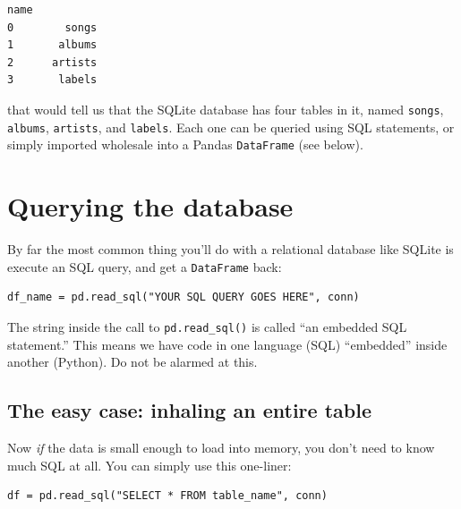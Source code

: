 \begin{Verbatim}[fontsize=\small,samepage=true,frame=leftline,framesep=5mm,framerule=1mm]
          name
0        songs
1       albums
2      artists
3       labels
\end{Verbatim}

that would tell us that the SQLite database has four tables in it, named
\texttt{songs}, \texttt{albums}, \texttt{artists}, and \texttt{labels}. Each
one can be queried using SQL statements, or simply imported wholesale into a
Pandas \texttt{DataFrame} (see below).

\section{Querying the database}


By far the most common thing you'll do with a relational database like SQLite
is execute an SQL query, and get a \texttt{DataFrame} back:

\begin{Verbatim}[fontsize=\small,samepage=true,frame=single,framesep=3mm]
df_name = pd.read_sql("YOUR SQL QUERY GOES HERE", conn)
\end{Verbatim}


The string inside the call to \texttt{pd.read\_sql()} is called ``an embedded
SQL statement.'' This means we have code in one language (SQL) ``embedded''
inside another (Python). Do not be alarmed at this.


\subsection{The easy case: inhaling an entire table}
\label{easy1}

Now \textit{if} the data is small enough to load into memory, you don't need to
know much SQL at all. You can simply use this one-liner:


\begin{Verbatim}[fontsize=\small,samepage=true,frame=single,framesep=3mm]
df = pd.read_sql("SELECT * FROM table_name", conn)
\end{Verbatim}

